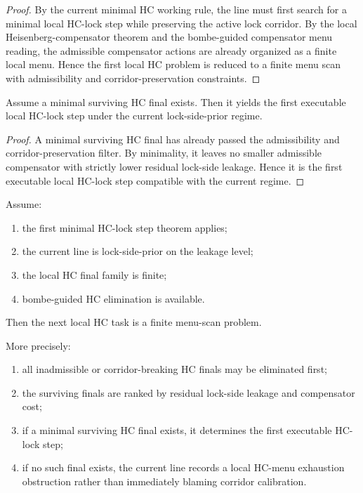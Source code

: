 \begin{proof}
By the current minimal HC working rule, the line must first search for a minimal local HC-lock step while preserving the active lock corridor. By the local Heisenberg-compensator theorem and the bombe-guided compensator menu reading, the admissible compensator actions are already organized as a finite local menu. Hence the first local HC problem is reduced to a finite menu scan with admissibility and corridor-preservation constraints.
\end{proof}

\begin{lemma}
\label{lem:minimal-surviving-hc-final-yields-first-executable-hc-lock-step}
Assume a minimal surviving HC final exists. Then it yields the first executable local HC-lock step under the current lock-side-prior regime.
\end{lemma}

\begin{proof}
A minimal surviving HC final has already passed the admissibility and corridor-preservation filter. By minimality, it leaves no smaller admissible compensator with strictly lower residual lock-side leakage. Hence it is the first executable local HC-lock step compatible with the current regime.
\end{proof}

\begin{theorem}
\label{thm:first-local-hc-menu-scan-theorem}
Assume:
\begin{enumerate}[leftmargin=2em,label=(\alph*)]
 \item the first minimal HC-lock step theorem applies;
 \item the current line is lock-side-prior on the leakage level;
 \item the local HC final family is finite;
 \item bombe-guided HC elimination is available.
\end{enumerate}
Then the next local HC task is a finite menu-scan problem.

More precisely:
\begin{enumerate}[leftmargin=2em,label=(\roman*)]
 \item all inadmissible or corridor-breaking HC finals may be eliminated first;
 \item the surviving finals are ranked by residual lock-side leakage and compensator cost;
 \item if a minimal surviving HC final exists, it determines the first executable HC-lock step;
 \item if no such final exists, the current line records a local HC-menu exhaustion obstruction rather than immediately blaming corridor calibration.
\end{enumerate}
\end{theorem}

